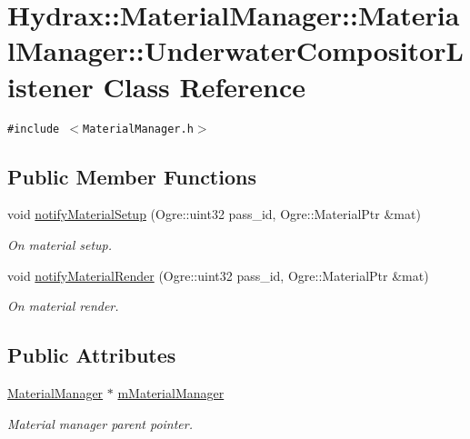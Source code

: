 \hypertarget{class_hydrax_1_1_material_manager_1_1_underwater_compositor_listener}{
\section{Hydrax::MaterialManager::MaterialManager::UnderwaterCompositorListener Class Reference}
\label{class_hydrax_1_1_material_manager_1_1_underwater_compositor_listener}
}
{\tt \#include $<$MaterialManager.h$>$}

\subsection*{Public Member Functions}
\begin{CompactItemize}
\item 
void \hyperlink{class_hydrax_1_1_material_manager_1_1_underwater_compositor_listener_989ac65c826b38ddd82704221f3f2973}{notifyMaterialSetup} (Ogre::uint32 pass\_\-id, Ogre::MaterialPtr \&mat)
\begin{CompactList}\small\item\em On material setup. \item\end{CompactList}\item 
void \hyperlink{class_hydrax_1_1_material_manager_1_1_underwater_compositor_listener_6aa720a9abfebef5671ebe1b4e70bf20}{notifyMaterialRender} (Ogre::uint32 pass\_\-id, Ogre::MaterialPtr \&mat)
\begin{CompactList}\small\item\em On material render. \item\end{CompactList}\end{CompactItemize}
\subsection*{Public Attributes}
\begin{CompactItemize}
\item 
\hyperlink{class_hydrax_1_1_material_manager}{MaterialManager} $\ast$ \hyperlink{class_hydrax_1_1_material_manager_1_1_underwater_compositor_listener_94ecea85a85083939a0dae2ed04035f1}{mMaterialManager}
\begin{CompactList}\small\item\em Material manager parent pointer. \item\end{CompactList}\end{CompactItemize}


